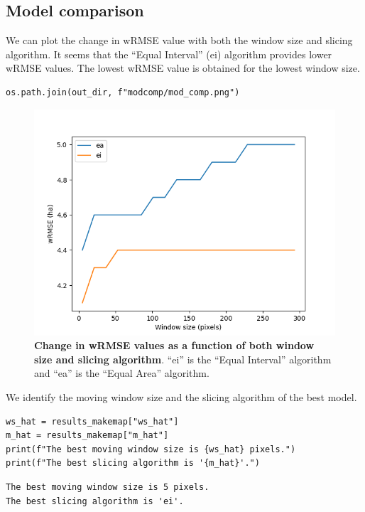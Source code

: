 \documentclass[paper=a4, 12pt, DIV=12]{scrartcl}
\begin{document}
\subsection{Model comparison}
\label{sec:org0980663}

We can plot the change in wRMSE value with both the window size and slicing algorithm. It seems that the ``Equal Interval'' (ei) algorithm provides lower wRMSE values. The lowest wRMSE value is obtained for the lowest window size. 

\begin{verbatim}
os.path.join(out_dir, f"modcomp/mod_comp.png")
\end{verbatim}

\begin{figure}[H]
\centering
\includegraphics[width=0.8\linewidth]{outputs/modcomp/mod_comp.png}
\caption{\label{fig:org921ba35}\textbf{Change in wRMSE values as a function of both window size and slicing algorithm}. ``ei'' is the ``Equal Interval'' algorithm and ``ea'' is the ``Equal Area'' algorithm.}
\end{figure}

We identify the moving window size and the slicing algorithm of the best model.

\begin{verbatim}
ws_hat = results_makemap["ws_hat"]
m_hat = results_makemap["m_hat"]
print(f"The best moving window size is {ws_hat} pixels.")
print(f"The best slicing algorithm is '{m_hat}'.")
\end{verbatim}

\begin{verbatim}
The best moving window size is 5 pixels.
The best slicing algorithm is 'ei'.
\end{verbatim}
\end{document}
